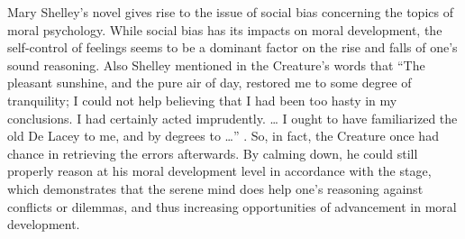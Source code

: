 \begin{text}
Mary Shelley's novel gives rise to the issue of social bias concerning the topics of  moral psychology. While social bias has its impacts on moral development, the self-control of feelings seems to be a dominant factor on the rise and falls of one's sound reasoning. Also Shelley mentioned in the Creature's words that ``The pleasant sunshine, and the pure air of day, restored me to some degree of tranquility; I could not help believing that I had been too hasty in my conclusions. I had certainly acted imprudently. \dots{} I ought to have familiarized the old De Lacey to me, and by degrees to \dots{}'' . So, in fact, the Creature once had chance in retrieving the errors afterwards. By calming down, he could still properly reason at his moral development level in accordance with the stage, which demonstrates that the serene mind does help one's reasoning against conflicts or dilemmas, and thus increasing opportunities of advancement in moral development.










\end{text}

